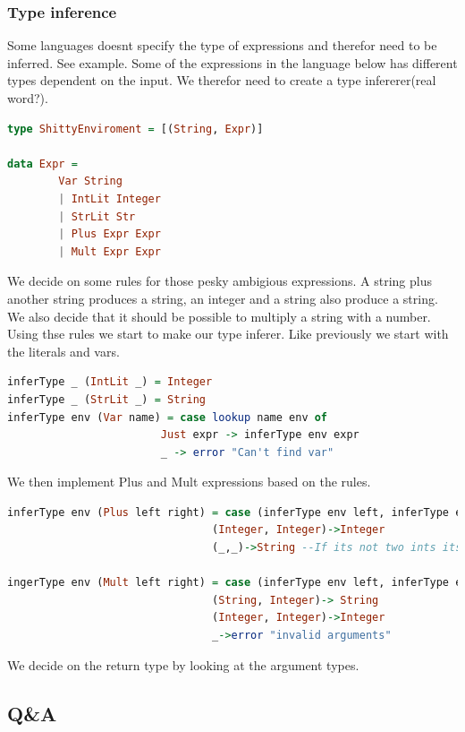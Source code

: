 \documentclass{article}
\begin{document}
            \subsubsection{Type inference}
            Some languages doesnt specify the type of expressions and therefor need to be inferred. See example.
            Some of the expressions in the language below has different types dependent on the input. We therefor need to create a type infererer(real word?).
            \begin{lstlisting}[language=Haskell]
type ShittyEnviroment = [(String, Expr)]

data Expr = 
        Var String
        | IntLit Integer
        | StrLit Str
        | Plus Expr Expr
        | Mult Expr Expr
            \end{lstlisting}
            We decide on some rules for those pesky ambigious expressions. A string plus another string produces a string, an integer and a string also produce a string.
            We also decide that it should be possible to multiply a string with a number. Using thse rules we start to make our type inferer.
            Like previously we start with the literals and vars.
            \begin{lstlisting}[language=Haskell]
inferType _ (IntLit _) = Integer
inferType _ (StrLit _) = String
inferType env (Var name) = case lookup name env of
                        Just expr -> inferType env expr
                        _ -> error "Can't find var"
            \end{lstlisting}
            We then implement Plus and Mult expressions based on the rules.
            \begin{lstlisting}[language=Haskell]
inferType env (Plus left right) = case (inferType env left, inferType env right) of
                                (Integer, Integer)->Integer
                                (_,_)->String --If its not two ints its a string!

ingerType env (Mult left right) = case (inferType env left, inferType env right) of
                                (String, Integer)-> String
                                (Integer, Integer)->Integer
                                _->error "invalid arguments"
            \end{lstlisting}
            We decide on the return type by looking at the argument types.
    \subsection{Q\&A}
\end{document}
